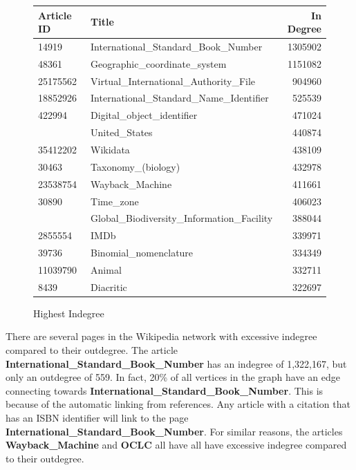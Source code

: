 \documentclass{article}
\begin{document}
\begin{figure}[H]
    \centering
    \caption{Highest Indegree}
    \begin{tabular}{llr}
        \toprule
        Article ID & Title & In Degree\\
        \midrule
        14919 & International\_Standard\_Book\_Number & 1305902\\
        48361 & Geographic\_coordinate\_system & 1151082\\
        25175562 & Virtual\_International\_Authority\_File & 904960\\
        18852926 & International\_Standard\_Name\_Identifier & 525539\\
        422994 & Digital\_object\_identifier & 471024\\
        \addlinespace
        3434750 & United\_States & 440874\\
        35412202 & Wikidata & 438109\\
        30463 & Taxonomy\_(biology) & 432978\\
        23538754 & Wayback\_Machine & 411661\\
        30890 & Time\_zone & 406023\\
        \addlinespace
        2987862 & Global\_Biodiversity\_Information\_Facility & 388044\\
        2855554 & IMDb & 339971\\
        39736 & Binomial\_nomenclature & 334349\\
        11039790 & Animal & 332711\\
        8439 & Diacritic & 322697\\
        \bottomrule
    \end{tabular}
\end{figure}
    
There are several pages in the Wikipedia network with excessive indegree compared to their outdegree. 
The article \textbf{International\_Standard\_Book\_Number} has an indegree of 1,322,167, but only an outdegree of 559. In fact, 20\% of all vertices in the graph have an edge connecting towards \textbf{International\_Standard\_Book\_Number}.
This is because of the automatic linking from references.
Any article with a citation that has an ISBN identifier will link to the page \textbf{International\_Standard\_Book\_Number}.
For similar reasons, the articles \textbf{Wayback\_Machine} and \textbf{OCLC} all have all have excessive indegree compared to their outdegree.
\end{document}
